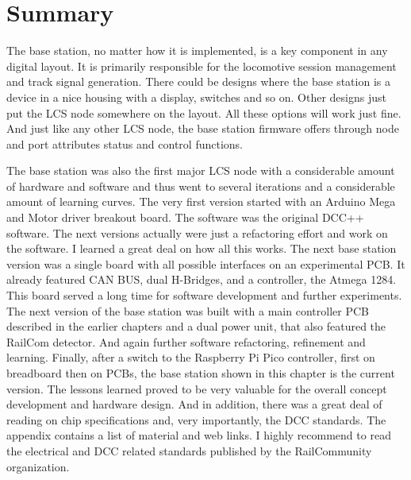
\section{Summary}

The base station, no matter how it is implemented, is a key component in any digital layout. It is primarily responsible for the locomotive session management and track signal generation. There could be designs where the base station is a device in a nice housing with a display, switches and so on. Other designs just put the LCS node somewhere on the layout. All these options will work just fine. And just like any other LCS node, the base station firmware offers through node and port attributes status and control functions.

The base station was also the first major LCS node with a considerable amount of hardware and software and thus went to several iterations and a considerable amount of learning curves. The very first version started with an Arduino Mega and Motor driver breakout board. The software was the original DCC++ software. The next versions actually were just a refactoring effort and work on the software. I learned a great deal on how all this works. The next base station version was a single board with all possible interfaces on an experimental PCB. It already featured CAN BUS, dual H-Bridges, and a controller, the Atmega 1284. This board served a long time for software development and further experiments. The next version of the base station was built with a main controller PCB described in the earlier chapters and a dual power unit, that also featured the RailCom detector. And again further software refactoring, refinement and learning. Finally, after a switch to the Raspberry Pi Pico controller, first on breadboard  then on PCBs, the base station shown in this chapter is the current version. The lessons learned proved to be very valuable for the overall concept development and hardware design. And in addition, there was a great deal of reading on chip specifications and, very importantly, the DCC standards. The appendix contains a list of material and web links. I highly recommend to read the electrical and DCC related standards published by the RailCommunity organization.

